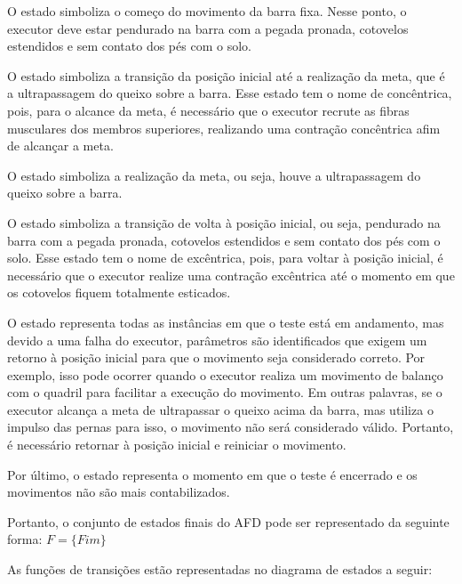 O estado  simboliza o começo do movimento da barra fixa. Nesse ponto, o executor deve estar pendurado na barra com a pegada pronada, cotovelos estendidos e sem contato dos pés com o solo.

O estado  simboliza a transição da posição inicial até a realização da meta, que é a ultrapassagem do queixo sobre a barra. Esse estado tem o nome de concêntrica, pois, para o alcance da meta, é necessário que o executor recrute as fibras musculares dos membros superiores, realizando uma contração concêntrica afim de alcançar a meta.

O estado  simboliza a realização da meta, ou seja, houve a ultrapassagem do queixo sobre a barra.

O estado  simboliza a transição de volta à posição inicial, ou seja, pendurado na barra com a pegada pronada, cotovelos estendidos e sem contato dos pés com o solo. Esse estado tem o nome de excêntrica, pois, para voltar à posição inicial, é necessário que o executor realize uma contração excêntrica até o momento em que os cotovelos fiquem totalmente esticados.

O estado  representa todas as instâncias em que o teste está em andamento, mas devido a uma falha do executor, parâmetros são identificados que exigem um retorno à posição inicial para que o movimento seja considerado correto. Por exemplo, isso pode ocorrer quando o executor realiza um movimento de balanço com o quadril para facilitar a execução do movimento. Em outras palavras, se o executor alcança a meta de ultrapassar o queixo acima da barra, mas utiliza o impulso das pernas para isso, o movimento não será considerado válido. Portanto, é necessário retornar à posição inicial e reiniciar o movimento. 

Por último, o estado  representa o momento em que o teste é encerrado e os movimentos não são mais contabilizados.

Portanto, o conjunto de estados finais do \ac{AFD} pode ser representado da seguinte forma: $F=\{Fim\}$

As funções de transições estão representadas no diagrama de estados a seguir:

